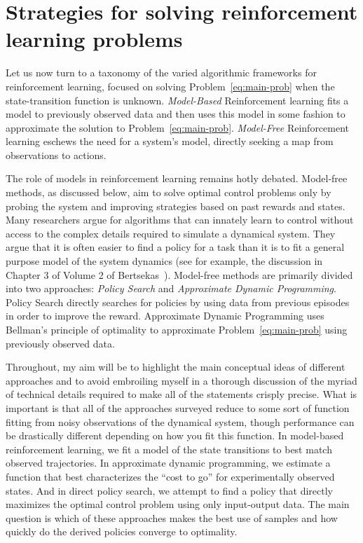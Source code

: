 \documentclass[11pt]{article}
\newcommand{\eqd}[1]{\eqref{eq:#1}}
\numberwithin{equation}{section}
\begin{document}
\section{Strategies for solving reinforcement learning problems}

Let us now turn to a taxonomy of the varied algorithmic frameworks for reinforcement learning, focused on solving Problem~\eqd{main-prob} when the state-transition function is unknown. \emph{Model-Based} Reinforcement learning fits a model to previously observed data and then uses this model in some fashion to approximate the solution to Problem~\eqd{main-prob}. \emph{Model-Free} Reinforcement learning eschews the need for a system's model, directly seeking a map from observations to actions.  

The role of models in reinforcement learning remains hotly debated. Model-free methods, as discussed below, aim to solve optimal control problems only by probing the system and improving strategies based on past rewards and states. Many researchers argue for algorithms that can innately learn to control without access to the complex details required to simulate a dynamical system. They argue that it is often easier to find a policy for a task than it is to fit a general purpose model of the system dynamics (see for example, the discussion in Chapter 3 of Volume 2 of Bertsekas~\cite{BertsekasDPBook2}). Model-free methods are primarily divided into two approaches: \emph{Policy Search} and \emph{Approximate Dynamic Programming}. Policy Search directly searches for policies by using data from previous episodes in order to improve the reward. Approximate Dynamic Programming uses Bellman's principle of optimality to approximate Problem~\eqd{main-prob} using previously observed data. 

Throughout, my aim will be to highlight the main conceptual ideas of different approaches and to avoid embroiling myself in a thorough discussion of the myriad of technical details required to make all of the statements crisply precise. What is important is that all of the approaches surveyed reduce to some sort of function fitting from noisy observations of the dynamical system, though performance can be drastically different depending on how you fit this function. In model-based reinforcement learning, we fit a model of the state transitions to best match observed trajectories. In approximate dynamic programming, we estimate a function that best characterizes the ``cost to go'' for experimentally observed states. And in direct policy search, we attempt to find a policy that directly maximizes the optimal control problem using only input-output data. The main question is which of these approaches makes the best use of samples and how quickly do the derived policies converge to optimality. 
\end{document}
